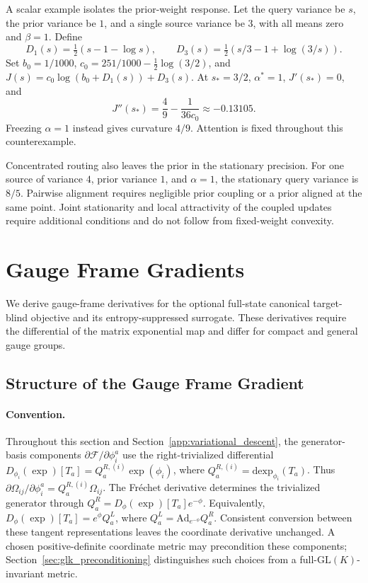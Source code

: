 \documentclass[twoside,11pt]{article}
\begin{document}
A scalar example isolates the prior-weight response. Let the query variance be $s$, the prior variance be $1$, and a single source variance be $3$, with all means zero and $\beta=1$. Define
\begin{equation}
D_1(s)=\tfrac12(s-1-\log s),\qquad
D_3(s)=\tfrac12(s/3-1+\log(3/s)).
\end{equation}
Set $b_0=1/1000$, $c_0=251/1000-\tfrac12\log(3/2)$, and
$J(s)=c_0\log(b_0+D_1(s))+D_3(s)$. At $s_*=3/2$, $\alpha^*=1$, $J'(s_*)=0$, and
\begin{equation}
J''(s_*)=\frac49-\frac{1}{36c_0}\approx-0.13105.
\end{equation}
Freezing $\alpha=1$ instead gives curvature $4/9$. Attention is fixed throughout this counterexample.

Concentrated routing also leaves the prior in the stationary precision. For one source of variance $4$, prior variance $1$, and $\alpha=1$, the stationary query variance is $8/5$. Pairwise alignment requires negligible prior coupling or a prior aligned at the same point. Joint stationarity and local attractivity of the coupled updates require additional conditions and do not follow from fixed-weight convexity.


\section{Gauge Frame Gradients}
\label{app:phi_gradients}

We derive gauge-frame derivatives for the optional full-state canonical target-blind objective and its entropy-suppressed surrogate. These derivatives require the differential of the matrix exponential map and differ for compact and general gauge groups.

\subsection{Structure of the Gauge Frame Gradient}

\paragraph{Convention.} Throughout this section and Section~\ref{app:variational_descent}, the generator-basis components $\partial\mathcal F/\partial\phi_i^a$ use the right-trivialized differential $D_{\phi_i}(\exp)[T_a]=Q_a^{R,(i)}\exp(\phi_i)$, where $Q_a^{R,(i)}=\mathrm{dexp}_{\phi_i}(T_a)$. Thus $\partial\Omega_{ij}/\partial\phi_i^a=Q_a^{R,(i)}\Omega_{ij}$. The Fr\'echet derivative determines the trivialized generator through $Q_a^R=D_\phi(\exp)[T_a]e^{-\phi}$. Equivalently, $D_\phi(\exp)[T_a]=e^\phi Q_a^L$, where $Q_a^L=\mathrm{Ad}_{e^{-\phi}}Q_a^R$. Consistent conversion between these tangent representations leaves the coordinate derivative unchanged. A chosen positive-definite coordinate metric may precondition these components; Section~\ref{sec:glk_preconditioning} distinguishes such choices from a full-$\mathrm{GL}(K)$-invariant metric.
\end{document}
